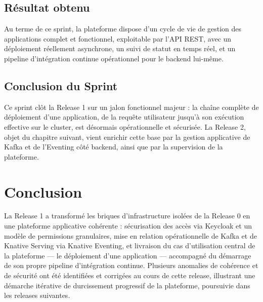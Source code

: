 \subsection{Résultat obtenu}

Au terme de ce sprint, la plateforme dispose d'un cycle de vie de gestion des applications complet et fonctionnel, exploitable par l'API REST, avec un déploiement réellement asynchrone, un suivi de statut en temps réel, et un pipeline d'intégration continue opérationnel pour le backend lui-même.

\subsection{Conclusion du Sprint}

Ce sprint clôt la Release 1 sur un jalon fonctionnel majeur : la chaîne complète de déploiement d'une application, de la requête utilisateur jusqu'à son exécution effective sur le cluster, est désormais opérationnelle et sécurisée. La Release 2, objet du chapitre suivant, vient enrichir cette base par la gestion applicative de Kafka et de l'Eventing côté backend, ainsi que par la supervision de la plateforme.

\section{Conclusion}

La Release 1 a transformé les briques d'infrastructure isolées de la Release 0 en une plateforme applicative cohérente : sécurisation des accès via Keycloak et un modèle de permissions granulaires, mise en relation opérationnelle de Kafka et de Knative Serving via Knative Eventing, et livraison du cas d'utilisation central de la plateforme — le déploiement d'une application — accompagné du démarrage de son propre pipeline d'intégration continue. Plusieurs anomalies de cohérence et de sécurité ont été identifiées et corrigées au cours de cette release, illustrant une démarche itérative de durcissement progressif de la plateforme, poursuivie dans les releases suivantes.
